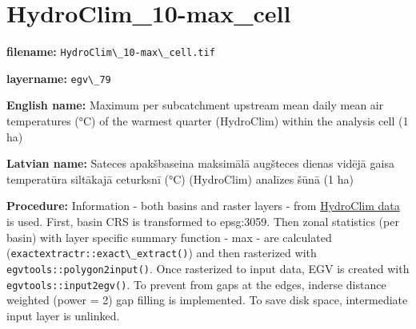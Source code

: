 \documentclass[
]{book}
\newcommand{\passthrough}[1]{#1}
\begin{document}
\section{HydroClim\_10-max\_cell}\label{ch06.079}

\textbf{filename:} \passthrough{\lstinline!HydroClim\_10-max\_cell.tif!}

\textbf{layername:} \passthrough{\lstinline!egv\_79!}

\textbf{English name:} Maximum per subcatchment upstream mean daily mean air temperatures (°C) of the warmest quarter (HydroClim) within the analysis cell (1 ha)

\textbf{Latvian name:} Sateces apakšbaseina maksimālā augšteces dienas vidējā gaisa temperatūra siltākajā ceturksnī (°C) (HydroClim) analīzes šūnā (1 ha)

\textbf{Procedure:} Information - both basins and raster layers - from \hyperref[Ch04.12]{HydroClim data}
is used. First, basin CRS is transformed to epsg:3059. Then zonal statistics (per basin) with
layer specific summary function - max - are calculated (\passthrough{\lstinline!exactextractr::exact\_extract()!})
and then rasterized with \passthrough{\lstinline!egvtools::polygon2input()!}. Once rasterized to input data,
EGV is created with \passthrough{\lstinline!egvtools::input2egv()!}. To prevent from gaps at the edges,
inderse distance weighted (power = 2) gap filling is implemented. To save disk space,
intermediate input layer is unlinked.
\end{document}
